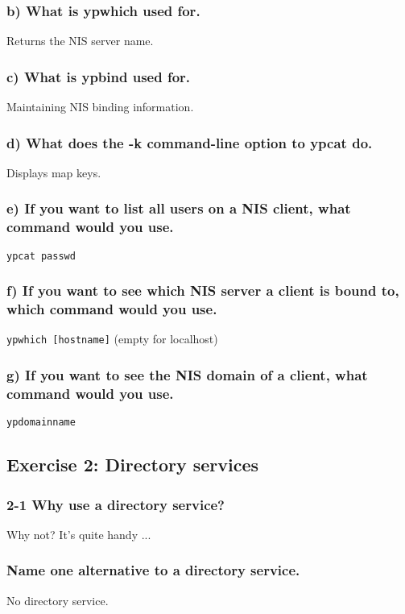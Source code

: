 \subsubsection{b) What is ypwhich used for.}
Returns the NIS server name.

\subsubsection{c) What is ypbind used for.}
Maintaining NIS binding information.

\subsubsection{d) What does the -k command-line option to ypcat do.}
Displays map keys.

\subsubsection{e) If you want to list all users on a NIS client, what command would you use.}
\verb=ypcat passwd=

\subsubsection{f) If you want to see which NIS server a client is bound to, which command would you use.}
\verb=ypwhich [hostname]= (empty for localhost)

\subsubsection{g) If you want to see the NIS domain of a client, what command would you use.}
\verb=ypdomainname=


\subsection{Exercise 2: Directory services}
\subsubsection{2-1 Why use a directory service?}
Why not? It's quite handy ...

\subsubsection{ Name one alternative to a directory service.}
No directory service.


